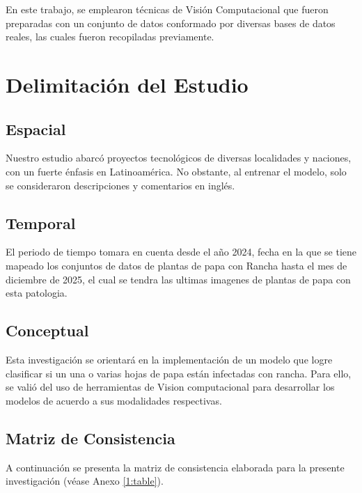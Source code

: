 En este trabajo, se emplearon técnicas de Visión Computacional que fueron preparadas con un conjunto de datos conformado por diversas bases de datos reales, las cuales fueron recopiladas previamente.

\section{Delimitación del Estudio}

\subsection{Espacial}
Nuestro estudio abarcó proyectos tecnológicos de diversas localidades y naciones, con un fuerte énfasis en Latinoamérica. No obstante, al entrenar el modelo, solo se consideraron descripciones y comentarios en inglés.

\subsection{Temporal}
El periodo de tiempo tomara en cuenta desde el año 2024, fecha en la que se tiene mapeado los conjuntos de datos de plantas de papa con Rancha hasta el mes de diciembre de 2025, el cual se tendra las ultimas imagenes de plantas de papa con esta patologia.

\subsection{Conceptual}
Esta investigación se orientará en la implementación de un modelo que logre clasificar si un una o varias hojas de papa están infectadas con rancha. Para ello, se valió del uso de herramientas de Vision computacional  para desarrollar los modelos de acuerdo a sus modalidades respectivas.
\subsection{Matriz de Consistencia}
A continuación se presenta la matriz de consistencia elaborada para la presente investigación (véase Anexo \ref{1:table}).